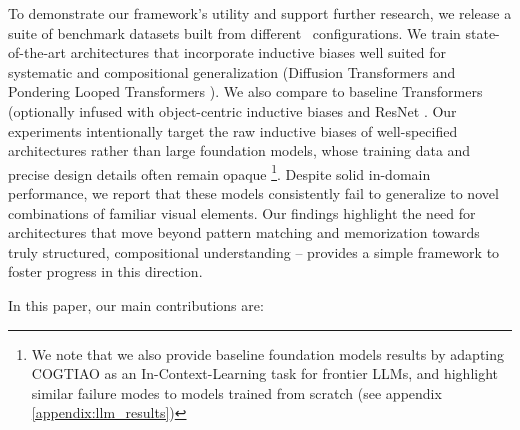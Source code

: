 To demonstrate our framework’s utility and support further research, we release a suite of benchmark datasets built from different \generatorName\ configurations. We train state-of-the-art architectures that incorporate inductive biases well suited for systematic and compositional generalization (Diffusion Transformers \cite{Nie_LLaDA_2025} and Pondering Looped Transformers \cite{banino2021pondernet, dehghani2019universaltransformers}). We also compare to baseline Transformers (optionally infused with object-centric inductive biases \cite{arc_vit} and ResNet \cite{he2015deepresiduallearningimage}. Our experiments intentionally target the raw inductive biases of well-specified architectures rather than large foundation models, whose training data and precise design details often remain opaque \footnote{We note that we also provide baseline foundation models results by adapting COGTIAO as an In-Context-Learning task for frontier LLMs, and highlight similar failure modes to models trained from scratch (see appendix \ref{appendix:llm_results})}. Despite solid in-domain performance, we report that these models consistently fail to generalize to novel combinations of familiar visual elements. Our findings highlight the need for architectures that move beyond pattern matching and memorization \cite{bahdanau2018systematic, geirhos2020shortcut, csordas2021devil, Faith_Fate} towards truly structured, compositional understanding -- \generatorName provides a simple framework to foster progress in this direction.

In this paper, our main contributions are:

